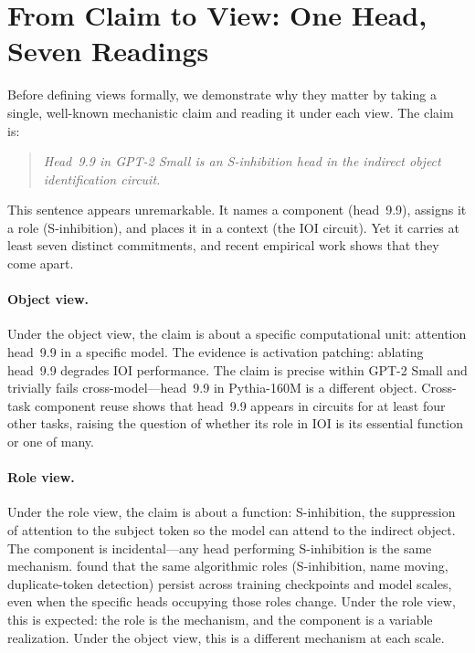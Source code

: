 \documentclass{article}
\begin{document}
\section{From Claim to View: One Head, Seven Readings}\label{sec:motivation}

Before defining views formally, we demonstrate why they matter by
taking a single, well-known mechanistic claim and reading it under
each view.  The claim is:

\begin{quote}
\emph{Head~9.9 in GPT-2 Small is an S-inhibition head in the
indirect object identification circuit.}
\end{quote}

This sentence appears unremarkable.  It names a component (head~9.9),
assigns it a role (S-inhibition), and places it in a context (the IOI
circuit).  Yet it carries at least seven distinct commitments, and recent
empirical work shows that they come apart.

\paragraph{Object view.}
Under the object view, the claim is about a specific computational unit:
attention head~9.9 in a specific model.  The evidence is activation
patching: ablating head~9.9 degrades IOI performance.  The claim is
precise within GPT-2 Small and trivially fails cross-model---head~9.9
in Pythia-160M is a different object.  Cross-task component reuse
\citep{merullo2024} shows that head~9.9 appears in circuits for at
least four other tasks, raising the question of whether its role in IOI
is its essential function or one of many.

\paragraph{Role view.}
Under the role view, the claim is about a function: S-inhibition,
the suppression of attention to the subject token so the model can
attend to the indirect object.  The component is incidental---any head
performing S-inhibition is the same mechanism.
\citet{tigges2024} found that the same algorithmic roles
(S-inhibition, name moving, duplicate-token detection) persist across
training checkpoints and model scales, even when the specific heads
occupying those roles change.  Under the role view, this is expected:
the role is the mechanism, and the component is a variable realization.
Under the object view, this is a different mechanism at each scale.
\end{document}
